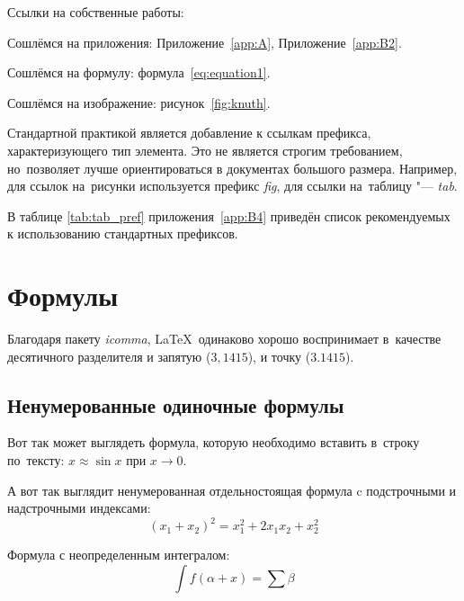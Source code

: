 %

Ссылки на собственные работы:~\cite{vakbib1, confbib1}

Сошлёмся на приложения: Приложение~\cref{app:A}, Приложение~\cref{app:B2}.

Сошлёмся на формулу: формула~\cref{eq:equation1}.

Сошлёмся на изображение: рисунок~\cref{fig:knuth}.

Стандартной практикой является добавление к ссылкам префикса, характеризующего тип элемента.
Это не является строгим требованием, но~позволяет лучше ориентироваться в документах большого размера.
Например, для ссылок на~рисунки используется префикс \textit{fig},
для ссылки на~таблицу "--- \textit{tab}.

В таблице \cref{tab:tab_pref} приложения~\cref{app:B4} приведён список рекомендуемых
к использованию стандартных префиксов.

\section{Формулы}\label{sec:ch1/sec3}

Благодаря пакету \textit{icomma}, \LaTeX~одинаково хорошо воспринимает
в~качестве десятичного разделителя и запятую (\(3,1415\)), и точку (\(3.1415\)).

\subsection{Ненумерованные одиночные формулы}\label{subsec:ch1/sec3/sub1}

Вот так может выглядеть формула, которую необходимо вставить в~строку
по~тексту: \(x \approx \sin x\) при \(x \to 0\).

А вот так выглядит ненумерованная отдельностоящая формула c подстрочными
и надстрочными индексами:
\[
(x_1+x_2)^2 = x_1^2 + 2 x_1 x_2 + x_2^2
\]

Формула с неопределенным интегралом:
\[
\int f(\alpha+x)=\sum\beta
\]

